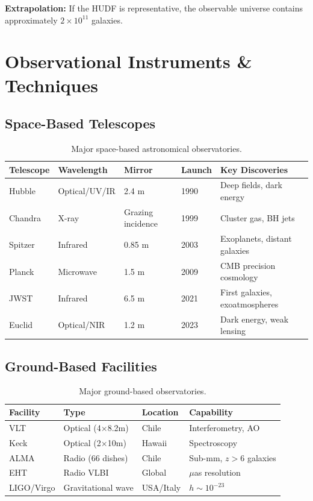 \documentclass[11pt,a4paper]{article}
\begin{document}
\textbf{Extrapolation:} If the HUDF is representative, the observable universe contains approximately $2 \times 10^{11}$ galaxies.

\newpage

\section{Observational Instruments \& Techniques}
\label{sec:instruments}

\subsection{Space-Based Telescopes}

\begin{table}[H]
\centering
\caption{Major space-based astronomical observatories.}
\label{tab:space_telescopes}
\small
\begin{tabular}{|l|l|l|l|l|}
\hline
\textbf{Telescope} & \textbf{Wavelength} & \textbf{Mirror} & \textbf{Launch} & \textbf{Key Discoveries} \\
\hline
Hubble & Optical/UV/IR & 2.4 m & 1990 & Deep fields, dark energy \\
Chandra & X-ray & Grazing incidence & 1999 & Cluster gas, BH jets \\
Spitzer & Infrared & 0.85 m & 2003 & Exoplanets, distant galaxies \\
Planck & Microwave & 1.5 m & 2009 & CMB precision cosmology \\
JWST & Infrared & 6.5 m & 2021 & First galaxies, exoatmospheres \\
Euclid & Optical/NIR & 1.2 m & 2023 & Dark energy, weak lensing \\
\hline
\end{tabular}
\end{table}

\subsection{Ground-Based Facilities}

\begin{table}[H]
\centering
\caption{Major ground-based observatories.}
\label{tab:ground_telescopes}
\small
\begin{tabular}{|l|l|l|l|}
\hline
\textbf{Facility} & \textbf{Type} & \textbf{Location} & \textbf{Capability} \\
\hline
VLT & Optical (4$\times$8.2m) & Chile & Interferometry, AO \\
Keck & Optical (2$\times$10m) & Hawaii & Spectroscopy \\
ALMA & Radio (66 dishes) & Chile & Sub-mm, $z>6$ galaxies \\
EHT & Radio VLBI & Global & $\mu$as resolution \\
LIGO/Virgo & Gravitational wave & USA/Italy & $h \sim 10^{-23}$ \\
\hline
\end{tabular}
\end{table}
\end{document}

